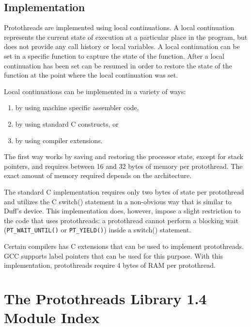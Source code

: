 \documentclass[12pt]{article}
\begin{document}
\begin{CJK}{UTF8}{bsmi}
\subsection{Implementation}

Protothreads are implemented using local continuations. A local continuation represents the current state of execution at a particular place in the program, but does not provide any call history or local variables.  A local continuation can be set in a specific function to capture the state of the function. After a local continuation has been set can be resumed in order to restore the state of the function at the point where the local continuation was set.

Local continuations can be implemented in a variety of ways:

\begin{enumerate}
\item by using machine specific assembler code,
\item by using standard C constructs, or
\item by using compiler extensions.
\end{enumerate}

The first way works by saving and restoring the processor state, except for stack pointers, and requires between 16 and 32 bytes of memory per protothread. The exact amount of memory required depends on the architecture.

The standard C implementation requires only two bytes of state per protothread and utilizes the C switch() statement in a non-obvious way that is similar to Duff’s device. This implementation does, however, impose a slight restriction to the code that uses protothreads: a protothread cannot perform a blocking wait (\verb+PT_WAIT_UNTIL()+ or \verb+PT_YIELD()+) inside a switch() statement.

Certain compilers has C extensions that can be used to implement protothreads. GCC supports label pointers that can be used for this purpose. With this implementation, protothreads require 4 bytes of RAM per protothread.

\section{The Protothreads Library 1.4 Module Index}

\end{CJK}
\end{document}
